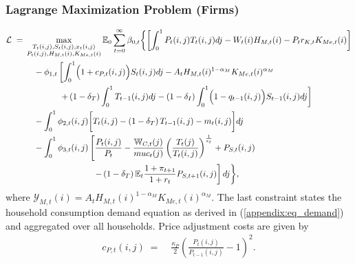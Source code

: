 \documentclass[12pt,3p,authoryear,review]{elsarticle}
\begin{document}
\subsubsection{Lagrange Maximization Problem (Firms)}%
\vspace{-0.2in}%
\begin{small}
 	\begin{align*}%
 		\mathcal{L} \; = \; & \max_{\substack{T_t(i,j),S_t(i,j),x_t(i,j)\\P_t(i,j),H_{M,t}(i),K_{Me,t}(i)}} \mathbb{E}_0 \sum_{t=0}^{\infty} \beta_{0,t} \biggl\{ \left[ \int_0^1 P_t(i,j) T_t(i,j) dj - W_t(i) H_{M,t}(i) - P_t r_{K,t} K_{Me,t}(i) \right] \\%
 		& \quad - \phi_{1,t} \left[ \int_0^1 \Bigl(1+c_{P,t}(i,j)\Bigr) S_t(i,j) dj - A_t H_{M,t}(i)^{1-\alpha_M} K_{Me,t}(i)^{\alpha_M} \right. \\%
		& \quad \quad \quad \quad \left. +\left(1-\delta_T\right)\int_0^1 T_{t-1}(i,j)dj -\left(1-\delta_I\right) \int_0^1 \Bigl(1-q_{t-1}(i,j)\Bigr) S_{t-1}(i,j) dj \right]\\%
 		& \quad - \int_0^1 \phi_{2,t}(i,j) \biggl[ T_t(i,j) - \left(1-\delta_T\right) T_{t-1}(i,j) - m_t(i,j) \biggr] dj \\%
 		& \quad - \int_0^1 \phi_{3,t}(i,j) \left[ \frac{P_t(i,j)}{P_t} - \frac{\mathbb{W}_{C,t}(j)}{muc_t(j)}\left(\frac{T_t(j)}{T_t(i,j)}\right)^{\frac{1}{\epsilon_t}} + P_{S,t}(i,j) \right.\\%
		& \quad \quad \quad \quad \quad \quad \quad \quad \left. - \left(1-\delta_T\right) \mathbb{E}_t \frac{1+\pi_{t+1}}{1+r_t} P_{S,t+1}(i,j) \right] dj \biggr\},%
 	\end{align*}%
 	where $\mathcal{Y}_{M,t}(i) = A_t H_{M,t}(i)^{1-\alpha_M} K_{Me,t}(i)^{\alpha_M}$. The last constraint states the household consumption demand equation as derived in (\ref{appendix:eq_demand}) and aggregated over all households. Price adjustment costs are given by%
	\begin{align*}%
		c_{P,t}(i,j) \; = & \; \frac{\kappa_P}{2} \left( \frac{P_t(i,j)}{P_{t-1}(i,j)} - 1 \right)^2.%
	\end{align*}%
\end{small}%
\end{document}
